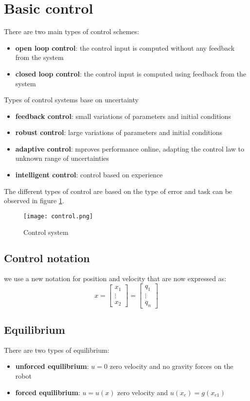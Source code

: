\documentclass[a4paper,12pt]{article}
\begin{document}
\section{Basic control}
There are two main types of control schemes:
\begin{itemize}
    \item \textbf{open loop control}: the control input is computed 
    without any feedback from the system
    \item \textbf{closed loop control}: the control input is computed 
    using feedback from the system
\end{itemize}
Types of control systems base on uncertainty
\begin{itemize}
    \item \textbf{feedback control}: small variations of parameters and initial
    conditions
    \item \textbf{robust control}: large variations of parameters and
     initial conditions
     \item \textbf{adaptive control}: mproves performance online, 
     adapting the control law to unknown
     range of uncertainties
    \item \textbf{intelligent control}: control based on experience
\end{itemize}
The different types of control are based on the type of
error and task can be observed in figure \ref{fig:Control system}.
\begin{figure}
    \centering
    \texttt{[image: control.png]}
    \caption{Control system}
    \label{fig:Control system}
\end{figure}
\subsection{Control notation}
we use a new notation for position and velocity that are now expressed as:
\begin{equation}
    x = \begin{bmatrix}
        x_1 \\
        \vdots \\
        x_2
    \end{bmatrix}=
    \begin{bmatrix}
        q_1 \\
        \vdots \\
        q_n
    \end{bmatrix}
\end{equation}
\subsection{Equilibrium}
There are two types of equilibrium:
\begin{itemize}
    \item \textbf{unforced equilibrium}: $u=0$ zero velocity and 
    no gravity forces on the robot
    \item \textbf{forced equilibrium}: $u=u(x)$ zero velocity and
        $u(x_e)=g(x_{e1})$
\end{itemize}
\end{document}
